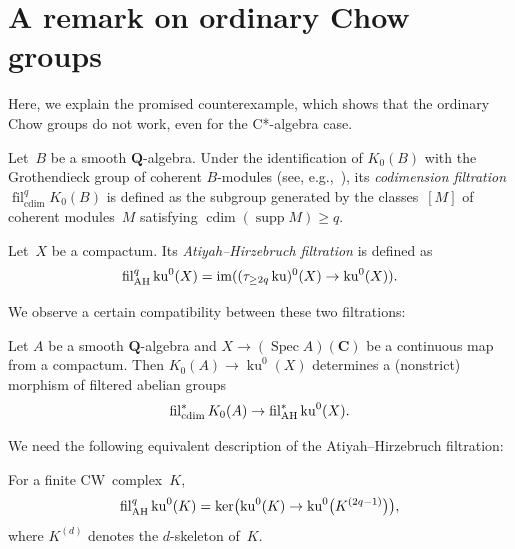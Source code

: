 \documentclass[11pt,a4paper]{amsart}
\numberwithin{equation}{section}
\theoremstyle{plain}
\theoremstyle{definition}
\theoremstyle{remark}
\newcommand{\QQ}{\mathbf{Q}}
\newcommand{\CC}{\mathbf{C}}
\newcommand{\AH}{\textnormal{AH}}
\newcommand{\Spec}{\operatorname{Spec}}
\newcommand{\cdim}{\operatorname{cdim}}
\newcommand{\fil}{\operatorname{fil}}
\newcommand{\ku}{\operatorname{ku}}
\newcommand{\supp}{\operatorname{supp}}
\begin{document}
\section{A remark on ordinary Chow groups}\label{s:ordinary}

Here, we explain the promised counterexample,
which shows that
the ordinary Chow groups do not work,
even for the C*-algebra case.

\begin{definition}\label{xx7m8a}
  Let~\(B\) be a smooth \(\QQ\)-algebra. Under the identification of
  \(K_{0}(B)\) with the Grothendieck group of coherent \(B\)-modules
  (see, e.g.,~\cite[Tags~0FDH and~0FDI]{SP}),
  its \emph{codimension filtration}
  \(
    \fil^{q}_{\cdim}K_{0}(B)
  \) is defined as the subgroup
  generated by the classes~\([M]\)
  of coherent modules~\(M\)
  satisfying \(\cdim(\supp M)\geq q\).
\end{definition}

\begin{definition}\label{xx0p2x}
  Let~\(X\) be a compactum.
  Its \emph{Atiyah–Hirzebruch filtration} is
  defined as
  \begin{equation*}
    \fil^{q}_{\AH}\ku^{0}(X)
    =\operatorname{im}((\tau_{\geq2q}\ku)^{0}(X)
    \to\ku^{0}(X)).
  \end{equation*}
\end{definition}

We observe a certain compatibility between these two filtrations:

\begin{proposition}\label{fils}
  Let \(A\) be a smooth \(\QQ\)-algebra
  and \(X\to(\Spec A)(\CC)\)
  be a continuous map from a compactum.
  Then \(K_{0}(A)\to\ku^{0}(X)\) determines
  a (nonstrict) morphism of filtered abelian groups
  \begin{equation*}
    \fil^{*}_{\cdim}K_{0}(A)\to
    \fil^{*}_{\AH}\ku^{0}(X).
  \end{equation*}
\end{proposition}

We need the following equivalent description
of the Atiyah–Hirzebruch filtration:

\begin{lemma}\label{xdm1cd}
  For a finite CW~complex~\(K\),
  \begin{equation*}
    \fil^{q}_{\AH}\ku^{0}(K)=\ker\bigl(
    \ku^{0}(K)
    \to
    \ku^{0}\bigl(K^{(2q-1)}\bigr)
    \bigr),
  \end{equation*}
  where \(K^{(d)}\) denotes the \(d\)-skeleton of~\(K\).
\end{lemma}
\end{document}
